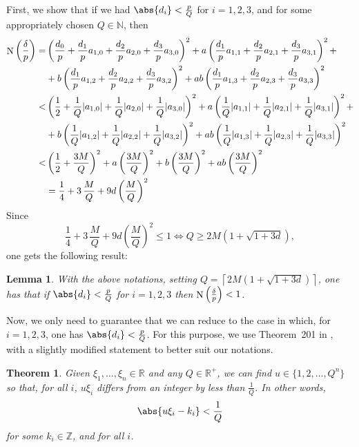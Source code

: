 \documentclass[10pt]{article}
\newtheorem{theorem}{Theorem}
\newtheorem{lemma}{Lemma}
\theoremstyle{definition}
\newcommand\NN{\mathbb{N}}
\newcommand\ZZ{\mathbb{Z}}
\newcommand\RR{\mathbb{R}}
\newcommand\N{\mathop{\rm N}\nolimits}
\begin{document}
First, we show that if we had $\abs{d_i} < \frac{p}{Q}$ for $i=1,2,3$,
and for some appropriately chosen $Q\in\NN$, then
%
\small
\begin{alignat*}{3}
  \N \left(\frac{\delta}{p} \right) = & \left(\frac{d_0}{p} +
    \frac{d_1}{p} a_{1,0} + \frac{d_2}{p} a_{2,0} + \frac{d_3}{p}
    a_{3,0} \right )^2 + a \left(\frac{d_1}{p} a_{1,1} +
    \frac{d_2}{p} a_{2,1} + \frac{d_3}{p} a_{3,1} \right)^2 + \\
  & + b \left( \frac{d_1}{p} a_{1,2} + \frac{d_2}{p} a_{2,2} +
    \frac{d_3}{p} a_{3,2} \right)^2 + ab \left( \frac{d_1}{p} a_{1,3}
    + \frac{d_2}{p} a_{2,3}+ \frac{d_3}{p} a_{3,3} \right)^2  \\
  < & \left( \frac{1}{2} + \frac{1}{Q} |a_{1,0}| + \frac{1}{Q}
    |a_{2,0}| + \frac{1}{Q} |a_{3,0}|\right )^2 + a \left( \frac{1}{Q}
    |a_{1,1}| + \frac{1}{Q} |a_{2,1}| + \frac{1}{Q}
    |a_{3,1}|\right )^2 + \\
  & + b \left( \frac{1}{Q} |a_{1,2}| + \frac{1}{Q} |a_{2,2}| +
    \frac{1}{Q} |a_{3,2}|\right )^2 + ab \left(\frac{1}{Q} |a_{1,3}| +
    \frac{1}{Q} |a_{2,3}| + \frac{1}{Q} |a_{3,3}|\right )^2 \\
  < & \left( \frac{1}{2} + \frac{3M}{Q}\right )^2 + a \left
    (\frac{3M}{Q}\right )^2 + b \left( \frac{3M}{Q}\right )^2 +
  ab\left( \frac{3M}{Q}\right )^2 \\
  & = \frac{1}{4} + 3\, \frac{M}{Q} + 9d \left(\frac{M}{Q}\right)^2
\end{alignat*}
%
\normalsize Since
%
\[\frac{1}{4} + 3\, \frac{M}{Q} + 9d
\left(\frac{M}{Q}\right)^2 \leq 1 \iff Q \geq 2M (1+\sqrt{1+3d}),
\]
one gets the following result:
%
\begin{lemma}\label{estimateN}
  With the above notations, setting
  $Q = \left \lceil 2 M (1+\sqrt{1+3d}) \right \rceil$, one has that
  if $\abs{d_i} < \frac{p}{Q}$ for $i=1,2,3$ then
  $ \N\left(\frac{\delta}{p}\right) < 1$.
\end{lemma}

Now, we only need to guarantee that we can reduce to the case in
which, for $i=1,2,3$, one has $\abs{d_i} < \frac{p}{Q}$. For this
purpose, we use Theorem~201 in \cite[Chap.~IX, p.~170]{Hardy_Wright},
with a slightly modified statement to better suit our notations.

\begin{theorem}\label{Hardy-Wright-Thm}
  Given $\xi_1, \dots, \xi_n \in \RR$ and any $Q \in \RR^+$, we can
  find $u \in \{1, 2, \dots, Q^n\}$ so that, for all $i$, $u \xi_i$
  differs from an integer by less than $\frac{1}{Q}$. In other words,
  \[ \abs{ u \xi_i - k_i} < \frac{1}{Q} \] for some $k_i \in \ZZ$, and
  for all $i$.
\end{theorem}
\end{document}
